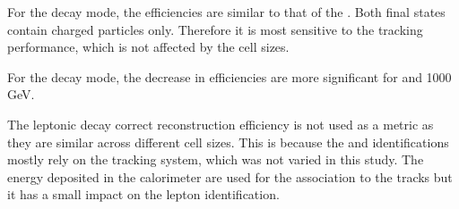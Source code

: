 For the \decayAiPionShort decay mode, the efficiencies are similar to that of the \decayPionShort. Both final states contain charged particles only. Therefore it is most sensitive to the tracking performance, which is not affected by the \ECAL cell sizes.

For the \decayThreePionPhotonShort decay mode, the decrease in efficiencies are more significant for  and 1000\,GeV.

The leptonic decay  correct reconstruction efficiency is not used as a metric as they are similar across different \ECAL cell sizes. This is because the \Pepm and \Pgmpm identifications mostly rely on the tracking system, which was not varied in this study. The energy deposited in the calorimeter are used for the association to the tracks but it has a small impact on the lepton identification.


